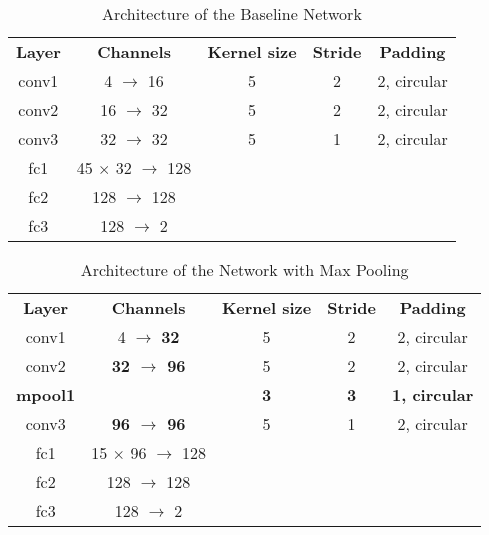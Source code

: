 \documentclass[conference]{IEEEtran}
\begin{document}
\begin{table}[htbp]
	\caption{Architecture of the Baseline Network}
	\begin{center}
		\begin{tabular}{|c|c|c|c|c|}
			\hline
			\textbf{Layer}&\textbf{Channels} &\textbf{Kernel size} &\textbf{Stride} &\textbf{Padding}\\
			\cline{1-5}
			conv1 &  4 $\rightarrow$ 16 & 5 & 2 & 2, circular \\ \hline
			conv2 & 16 $\rightarrow$ 32 & 5 & 2 & 2, circular \\ \hline
			conv3 & 32 $\rightarrow$  			 32 & 5 & 1 & 2, circular \\ \hline
			fc1 &   45 $\times$ 32 $\rightarrow$ 128 &  &  &  \\ \hline
			fc2 &  128 $\rightarrow$ 128 &  &  &  \\ \hline
			fc3 &  128 $\rightarrow$   2 &  &  &  \\ \hline
		\end{tabular}
		\label{tab: baseline}
	\end{center}
\end{table}

\begin{table}[htbp]
	\caption{Architecture of the Network with Max Pooling}
	\begin{center}
		\begin{tabular}{|c|c|c|c|c|}
			\hline
			\textbf{Layer}&\textbf{Channels} &\textbf{Kernel size} &\textbf{Stride} &\textbf{Padding}\\
			\cline{1-5}
			conv1  &   4 $\rightarrow$  \bfseries	32 & 5 & 2 & 2, circular \\ \hline
			conv2  & \bfseries 32 $\rightarrow$  	96 & 5 & 2 & 2, circular \\ \hline
			\bfseries mpool1 & 					   & \bfseries 3	& \bfseries 3 & \bfseries 1, circular \\ 
			\hline			
			conv3  & \bfseries 96 $\rightarrow$  	96 & 5 & 1 & 2, circular \\ \hline
			fc1    & 15 $\times$ 96 $\rightarrow$ 128 &  &  &  \\ \hline
			fc2    & 128 $\rightarrow$ 128 &  &  &  \\ \hline
			fc3    & 128 $\rightarrow$   2 &  &  &  \\ \hline
		\end{tabular}
		\label{tab: maxpool}
	\end{center}
\end{table}
\end{document}
